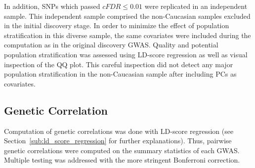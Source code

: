 In addition, SNPs which passed $cFDR\leq 0.01$ were replicated in an independent sample.
This independent sample comprised the non-Caucasian samples excluded in the initial discovery stage.
In order to minimize the effect of population stratification in this diverse sample, the same covariates were included during the computation as in the original discovery GWAS\@.
Quality and potential population stratification was assessed using LD-score regression as well as visual inspection of the QQ plot.
This careful inspection did not detect any major population stratification in the non-Caucasian sample after including PCs as covariates.

\subsection{Genetic Correlation}
\label{sub:genetic_correlation_ukb_assoc}

Computation of genetic correlations was done with LD-score regression (see Section~\ref{sub:ld_score_regression} for further explanations).
Thus, pairwise genetic correlations were computed on the summary statistics of each GWAS\@.
Multiple testing was addressed with the more stringent Bonferroni correction.
